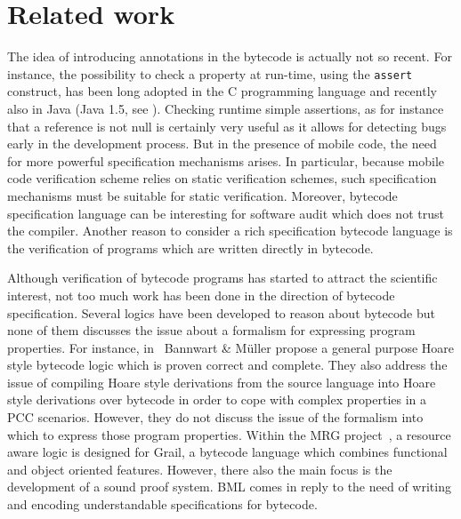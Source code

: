 

\section{Related work}\label{bml:relWork}

The idea of introducing annotations in the bytecode is actually not so recent.  
For instance, the possibility to check a property at run-time, using the \texttt{assert}
 construct, has been long adopted in the C programming language and recently also in Java (Java
1.5, see \cite[\S 14.10]{JLS}). Checking runtime simple assertions,
 as for instance that a reference is not  null is certainly very useful as it
 allows for detecting bugs early in the development process.    
But  in the presence of mobile code, the need for more
 powerful specification mechanisms arises. In particular, because mobile code verification scheme
 relies on static verification schemes, such specification mechanisms must be suitable 
 for static verification. Moreover, bytecode specification language can be interesting for software audit
 which does not trust the compiler. Another reason to 
 consider a rich specification bytecode language  is the verification of programs which
 are written directly in bytecode. 

Although verification of bytecode programs has started to attract 
the scientific interest,  not too much work has been done in
the direction of bytecode specification. Several logics have been developed to reason about
bytecode but none of them discusses the issue about a formalism for expressing program properties.
For instance, in~\cite{BannwartMueller05} Bannwart \& M\"uller propose a general purpose Hoare style bytecode logic
 which is proven correct and complete. They also address the issue of compiling Hoare style derivations 
from the source language into Hoare style derivations over bytecode in order to cope with complex properties in a PCC scenarios.
 However, they do not discuss the issue of the formalism into which to
 express those program properties. Within the MRG project~\cite{AspinallEtAl:TPHOLs2004}, a resource aware logic is designed for Grail, a bytecode
language which combines functional and object oriented features.  However, there also the main focus is the development of a sound proof system.
 BML comes in reply to the need of  writing  and encoding understandable specifications for
bytecode.


